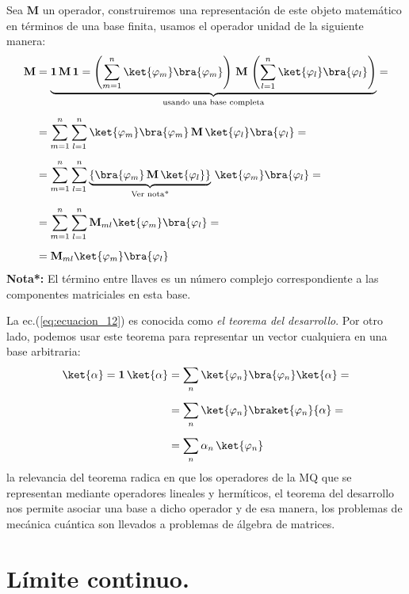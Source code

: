 Sea $\mathbf{M}$ un operador, construiremos una representación de este objeto matemático en términos de una base finita, usamos el operador unidad de la siguiente manera:
\begin{align}
\begin{aligned}[b]
\mathbf{M} &= \underbrace{\mathbf{1 \, M \, 1} =  \left( \sum_{m=1}^{n} \ket{\varphi_{m}} \bra{\varphi_{m}} \right) \, \mathbf{M} \, \left( \sum_{l=1}^{n} \ket{\varphi_{l}} \bra{\varphi_{l}} \right)}_{\text{usando una base completa}} = \\[0.5em]
&= \sum_{m=1}^{n} \sum_{l=1}^{n} \ket{\varphi_{m}} \bra{\varphi_{m}} \, \mathbf{M} \, \ket{\varphi_{l}} \bra{\varphi_{l}} = \\[0.5em]
&= \sum_{m=1}^{n} \sum_{l=1}^{n} \underbrace{\left\{ \bra{\varphi_{m}} \, \mathbf{M} \, \ket{\varphi_{l}} \right\}}_{\text{Ver nota*}} \, \ket{\varphi_{m}} \bra{\varphi_{l}} = \\[0.5em]
&= \sum_{m=1}^{n} \sum_{l=1}^{n} \mathbf{M}_{ml} \ket{\varphi_{m}} \bra{\varphi_{l}} = \\[0.5em]
&= \mathbf{M}_{ml} \ket{\varphi_{m}} \bra{\varphi_{l}}
\end{aligned}
\label{eq:ecuacion_12}
\end{align}
\textbf{Nota*: } El término entre llaves es un número complejo correspondiente a las componentes matriciales en esta base.
\par
La ec.(\ref{eq:ecuacion_12}) es conocida como \emph{el teorema del desarrollo}. Por otro lado, podemos usar este teorema para representar un vector cualquiera en una base arbitraria:
\begin{align}
\begin{aligned}[b]
\ket{\alpha} = \mathbf{1} \, \ket{\alpha} &= \sum_{n} \ket{\varphi_{n}} \bra{\varphi_{n}} \ket{\alpha} = \\[0.5em]
&= \sum_{n} \ket{\varphi_{n}} \braket{\varphi_{n}}{\alpha} = \\[0.5em]
&= \sum_{n} \alpha_{n} \, \ket{\varphi_{n}}
\end{aligned}
\label{eq:ecuacion_13}
\end{align}
la relevancia del teorema radica en que los operadores de la MQ que se representan mediante operadores lineales y hermíticos, el teorema del desarrollo nos permite asociar una base a dicho operador y de esa manera, los problemas de mecánica cuántica son llevados a problemas de álgebra de matrices.
\section{Límite continuo.}


